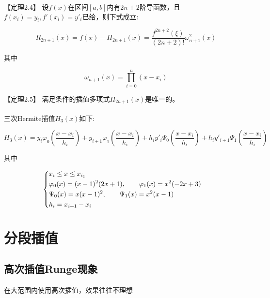 \documentclass[12pt]{report}
\begin{document}
【定理2.4】 \quad 设$f(x)$在区间$[a,b]$内有$2n+2$阶导函数，且$f(x_i)=y_i,f'(x_i)=y'_i$已给，则下式成立:

\begin{equation}
	R_{2n+1}(x) = f(x) - H_{2n+1}(x) = \frac{f^{2n+2}(\xi)}{(2n+2)!}\omega_{n+1}^2(x)
	\tag{2.14} \label{2.14}
\end{equation}

其中

\[
\omega_{n+1}(x) = \prod_{i=0}^n (x - x_i) 
\]

【定理2.5】 \quad 满足条件的插值多项式$H_{2n+1}(x)$是唯一的。

\paragraph{ } 三次Hermite插值$H_3(x)$如下:

\begin{equation}
	H_3(x)=y_i\varphi_0(\frac{x-x_i}{h_i})+y_{i+1}\varphi_1(\frac{x-x_i}{h_i})+
	h_iy'_i\Psi_0(\frac{x-x_i}{h_i})+h_iy'_{i+1}\Psi_1(\frac{x-x_i}{h_i})
	\tag{2.15} \label{2.15}
\end{equation}

其中

\begin{equation}
	\begin{cases}
	\begin{aligned}
		&x_i \le x \le x_{i_1}\\
		&\varphi_0(x)=(x-1)^2(2x+1), \qquad \varphi_1(x)=x^2(-2x+3)\\
		&\Psi_0(x)=x(x-1)^2, \qquad \Psi_1(x)=x^2(x-1)\\
		&h_i=x_{i+1}-x_i
	\end{aligned}
	\end{cases}
	\notag
\end{equation}


\section{分段插值}

\subsection{高次插值Runge现象}

\paragraph{ } 在大范围内使用高次插值，效果往往不理想
\end{document}
